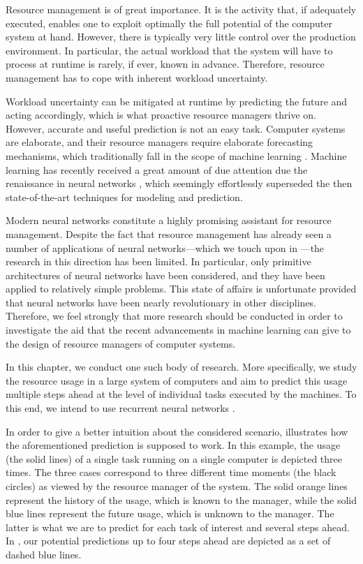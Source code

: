 Resource management is of great importance. It is the activity that, if
adequately executed, enables one to exploit optimally the full potential of the
computer system at hand. However, there is typically very little control over
the production environment. In particular, the actual workload that the system
will have to process at runtime is rarely, if ever, known in advance. Therefore,
resource management has to cope with inherent workload uncertainty.

Workload uncertainty can be mitigated at runtime by predicting the future and
acting accordingly, which is what proactive resource managers thrive on.
However, accurate and useful prediction is not an easy task. Computer systems
are elaborate, and their resource managers require elaborate forecasting
mechanisms, which traditionally fall in the scope of machine learning
\cite{hastie2013}. Machine learning has recently received a great amount of due
attention due the renaissance in neural networks \cite{goodfellow2016}, which
seemingly effortlessly superseded the then state-of-the-art techniques for
modeling and prediction.

Modern neural networks constitute a highly promising assistant for resource
management. Despite the fact that resource management has already seen a number
of applications of neural networks---which we touch upon in
---the research in this direction has been limited. In
particular, only primitive architectures of neural networks have been
considered, and they have been applied to relatively simple problems. This state
of affairs is unfortunate provided that neural networks have been nearly
revolutionary in other disciplines. Therefore, we feel strongly that more
research should be conducted in order to investigate the aid that the recent
advancements in machine learning can give to the design of resource managers of
computer systems.

In this chapter, we conduct one such body of research. More specifically, we
study the resource usage in a large system of computers and aim to predict this
usage multiple steps ahead at the level of individual tasks executed by the
machines. To this end, we intend to use recurrent neural networks
\cite{goodfellow2016}.

In order to give a better intuition about the considered scenario,
 illustrates how the aforementioned prediction is
supposed to work. In this example, the  usage (the solid lines) of a
single task running on a single computer is depicted three times. The three
cases correspond to three different time moments (the black circles) as viewed
by the resource manager of the system. The solid orange lines represent the
history of the usage, which is known to the manager, while the solid blue lines
represent the future usage, which is unknown to the manager. The latter is what
we are to predict for each task of interest and several steps ahead. In
, our potential predictions up to four steps ahead are
depicted as a set of dashed blue lines.

